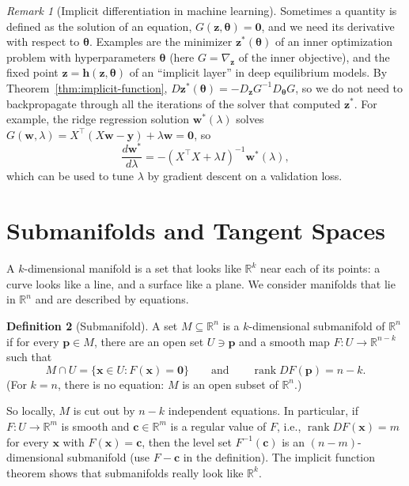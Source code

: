 \documentclass[11pt]{article}
\theoremstyle{definition}
\newtheorem{definition}{Definition}[section]
\theoremstyle{plain}
\theoremstyle{remark}
\newtheorem{remark}[definition]{Remark}
\DeclareMathOperator{\rank}{rank}
\begin{document}
\begin{remark}[Implicit differentiation in machine learning]\label{rem:implicit-ml}
    Sometimes a quantity is defined as the solution of an equation, $G(\mathbf{z}, \boldsymbol{\theta}) = \mathbf{0}$, and we need its derivative with respect to $\boldsymbol{\theta}$. Examples are the minimizer $\mathbf{z}^*(\boldsymbol{\theta})$ of an inner optimization problem with hyperparameters $\boldsymbol{\theta}$ (here $G = \nabla_{\mathbf{z}}$ of the inner objective), and the fixed point $\mathbf{z} = \mathbf{h}(\mathbf{z}, \boldsymbol{\theta})$ of an ``implicit layer'' in deep equilibrium models. By Theorem~\ref{thm:implicit-function}, $D\mathbf{z}^*(\boldsymbol{\theta}) = -D_{\mathbf{z}}G^{-1}D_{\boldsymbol{\theta}}G$, so we do not need to backpropagate through all the iterations of the solver that computed $\mathbf{z}^*$. For example, the ridge regression solution $\mathbf{w}^*(\lambda)$ solves $G(\mathbf{w}, \lambda) = X^\top(X\mathbf{w} - \mathbf{y}) + \lambda\mathbf{w} = \mathbf{0}$, so
    \[\frac{d\mathbf{w}^*}{d\lambda} = -(X^\top X + \lambda I)^{-1}\mathbf{w}^*(\lambda),\]
    which can be used to tune $\lambda$ by gradient descent on a validation loss.
\end{remark}

\section{Submanifolds and Tangent Spaces}\label{sec:manifolds}

A $k$-dimensional manifold is a set that looks like $\mathbb{R}^k$ near each of its points: a curve looks like a line, and a surface like a plane. We consider manifolds that lie in $\mathbb{R}^n$ and are described by equations.

\begin{definition}[Submanifold]\label{def:submanifold}
    A set $M \subseteq \mathbb{R}^n$ is a $k$-dimensional submanifold of $\mathbb{R}^n$ if for every $\mathbf{p} \in M$, there are an open set $U \ni \mathbf{p}$ and a smooth map $F: U \to \mathbb{R}^{n-k}$ such that
    \[M \cap U = \{\mathbf{x} \in U : F(\mathbf{x}) = \mathbf{0}\} \qquad \text{and} \qquad \rank DF(\mathbf{p}) = n - k.\]
    (For $k = n$, there is no equation: $M$ is an open subset of $\mathbb{R}^n$.)
\end{definition}

So locally, $M$ is cut out by $n - k$ independent equations. In particular, if $F: U \to \mathbb{R}^m$ is smooth and $\mathbf{c} \in \mathbb{R}^m$ is a regular value of $F$, i.e., $\rank DF(\mathbf{x}) = m$ for every $\mathbf{x}$ with $F(\mathbf{x}) = \mathbf{c}$, then the level set $F^{-1}(\mathbf{c})$ is an $(n - m)$-dimensional submanifold (use $F - \mathbf{c}$ in the definition). The implicit function theorem shows that submanifolds really look like $\mathbb{R}^k$.
\end{document}
